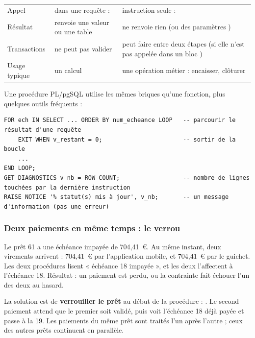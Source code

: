 \begin{center}\small
\begin{tabularx}{\linewidth}{@{}B{3.6cm} L L@{}}
\toprule
&  &  \\
\midrule
Appel & dans une requête :  & instruction seule :  \\
Résultat & renvoie une valeur ou une table & ne renvoie rien (ou des paramètres ) \\
Transactions & ne peut pas valider & peut faire  entre deux étapes (si elle n'est pas
appelée dans un bloc ) \\
Usage typique & un calcul & une opération métier : encaisser, clôturer \\
\bottomrule
\end{tabularx}
\end{center}

Une procédure PL/pgSQL utilise les mêmes briques qu'une fonction, plus quelques outils fréquents :
\begin{lstlisting}[style=sql]
FOR ech IN SELECT ... ORDER BY num_echeance LOOP   -- parcourir le résultat d'une requête
    EXIT WHEN v_restant = 0;                       -- sortir de la boucle
    ...
END LOOP;
GET DIAGNOSTICS v_nb = ROW_COUNT;                  -- nombre de lignes touchées par la dernière instruction
RAISE NOTICE '% statut(s) mis à jour', v_nb;       -- un message d'information (pas une erreur)
\end{lstlisting}

\subsubsection{Deux paiements en même temps : le verrou}

\begin{imagine}
Le prêt 61 a une échéance impayée de 704,41~€. Au même instant, deux virements arrivent : 704,41~€ par
l'application mobile, et 704,41~€ par le guichet. Les deux procédures lisent « échéance 18 impayée »,
et les deux l'affectent à l'échéance 18. Résultat : un paiement est perdu, ou la contrainte
 fait échouer l'un des deux au hasard.
\end{imagine}

La solution est de \textbf{verrouiller le prêt} au début de la procédure :
. Le second paiement attend que le
premier soit validé, puis voit l'échéance 18 déjà payée et passe à la 19. Les paiements du même prêt
sont traités l'un après l'autre ; ceux des autres prêts continuent en parallèle.


